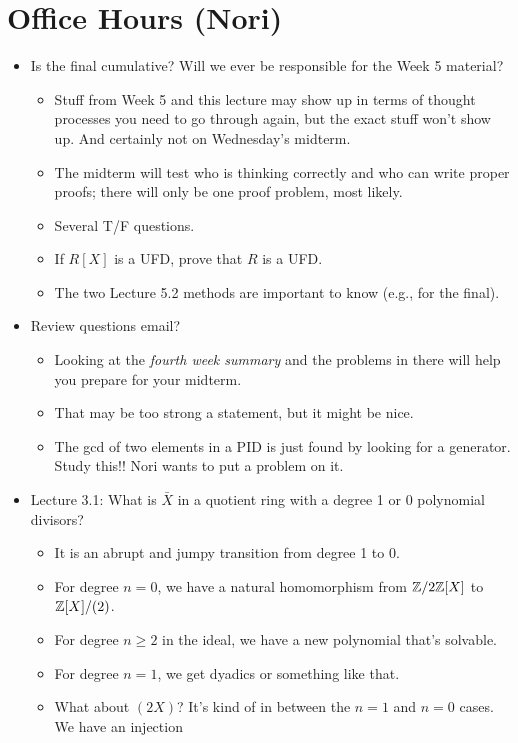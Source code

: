 \documentclass[../notes.tex]{subfiles}
\begin{document}
\section{Office Hours (Nori)}
\begin{itemize}
    \item Is the final cumulative? Will we ever be responsible for the Week 5 material?
    \begin{itemize}
        \item Stuff from Week 5 and this lecture may show up in terms of thought processes you need to go through again, but the exact stuff won't show up. And certainly not on Wednesday's midterm.
        \item The midterm will test who is thinking correctly and who can write proper proofs; there will only be one proof problem, most likely.
        \item Several T/F questions.
        \item If $R[X]$ is a UFD, prove that $R$ is a UFD.
        \item The two Lecture 5.2 methods are important to know (e.g., for the final).
    \end{itemize}
    \item Review questions email?
    \begin{itemize}
        \item Looking at the \emph{fourth week summary} and the problems in there will help you prepare for your midterm.
        \item That may be too strong a statement, but it might be nice.
        \item The gcd of two elements in a PID is just found by looking for a generator. Study this!! Nori wants to put a problem on it.
    \end{itemize}
    \item Lecture 3.1: What is $\bar{X}$ in a quotient ring with a degree 1 or 0 polynomial divisors?
    \begin{itemize}
        \item It is an abrupt and jumpy transition from degree 1 to 0.
        \item For degree $n=0$, we have a natural homomorphism from $\mathbb{Z}/2\mathbb{Z}[X]$ to $\mathbb{Z}[X]/(2)$.
        \item For degree $n\geq 2$ in the ideal, we have a new polynomial that's solvable.
        \item For degree $n=1$, we get dyadics or something like that.
        \item What about $(2X)$? It's kind of in between the $n=1$ and $n=0$ cases. We have an injection

\end{itemize}
\end{itemize}
\end{document}
